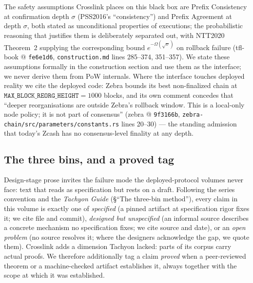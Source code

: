 \documentclass[11pt,a4paper]{article}
\theoremstyle{definition}
\begin{document}
The safety assumptions Crosslink places on this black box are Prefix
Consistency at confirmation depth $\sigma$ (PSS2016's ``consistency'')
and Prefix Agreement at depth $\sigma$, both stated as unconditional
properties of executions; the probabilistic reasoning that justifies
them is deliberately separated out, with NTT2020 Theorem~2 supplying the
corresponding bound $e^{-\Omega(\sqrt{\sigma})}$ on rollback failure
(tfl-book @ \texttt{fe6e1d6}, \texttt{construction.md} lines 285--374,
351--357). We state these assumptions formally in the construction
section and use them as the interface; we never derive them from PoW
internals. Where the interface touches deployed reality we cite the
deployed code: Zebra bounds its best non-finalized chain at
$\texttt{MAX\_BLOCK\_REORG\_HEIGHT} = 1000$ blocks, and its own comment
concedes that ``deeper reorganisations are outside Zebra's rollback
window. This is a local-only node policy; it is not part of consensus''
(zebra @ \texttt{9f3166b},
\texttt{zebra-chain/src/parameters/constants.rs} lines 20--30) --- the
standing admission that today's Zcash has no consensus-level finality at
any depth.

\subsection{The three bins, and a proved tag}\label{sec:xl-bins}

Design-stage prose invites the failure mode the deployed-protocol
volumes never face: text that reads as specification but rests on a
draft. Following the series convention and the \emph{Tachyon Guide}
(\S``The three-bin method''), every claim in this volume is exactly one
of \emph{specified} (a pinned artifact at specification rigor fixes it;
we cite file and commit), \emph{designed but unspecified} (an informal
source describes a concrete mechanism no specification fixes; we cite
source and date), or an \emph{open problem} (no source resolves it;
where the designers acknowledge the gap, we quote them). Crosslink adds
a dimension Tachyon lacked: parts of its corpus carry actual proofs. We
therefore additionally tag a claim \emph{proved} when a peer-reviewed
theorem or a machine-checked artifact establishes it, always together
with the scope at which it was established.
\end{document}
